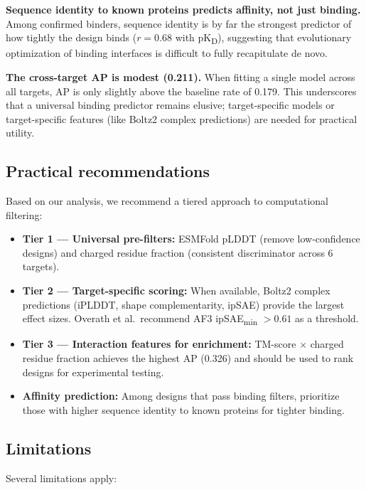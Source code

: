 \documentclass[11pt,a4paper]{article}
\newcommand{\pKD}{pK\textsubscript{D}}
\begin{document}
\textbf{Sequence identity to known proteins predicts affinity, not just binding.}
Among confirmed binders, sequence identity is by far the strongest predictor of how tightly the design binds ($r = 0.68$ with \pKD), suggesting that evolutionary optimization of binding interfaces is difficult to fully recapitulate de novo.

\textbf{The cross-target AP is modest (0.211).}
When fitting a single model across all targets, AP is only slightly above the baseline rate of 0.179.
This underscores that a universal binding predictor remains elusive; target-specific models or target-specific features (like Boltz2 complex predictions) are needed for practical utility.

\subsection{Practical recommendations}

Based on our analysis, we recommend a tiered approach to computational filtering:

\begin{itemize}
    \item \textbf{Tier 1 --- Universal pre-filters:} ESMFold pLDDT (remove low-confidence designs) and charged residue fraction (consistent discriminator across 6 targets).

    \item \textbf{Tier 2 --- Target-specific scoring:} When available, Boltz2 complex predictions (iPLDDT, shape complementarity, ipSAE) provide the largest effect sizes. Overath et al.\ recommend AF3 ipSAE\textsubscript{min} $> 0.61$ as a threshold.

    \item \textbf{Tier 3 --- Interaction features for enrichment:} TM-score $\times$ charged residue fraction achieves the highest AP (0.326) and should be used to rank designs for experimental testing.

    \item \textbf{Affinity prediction:} Among designs that pass binding filters, prioritize those with higher sequence identity to known proteins for tighter binding.
\end{itemize}

\subsection{Limitations}

Several limitations apply:
\end{document}
